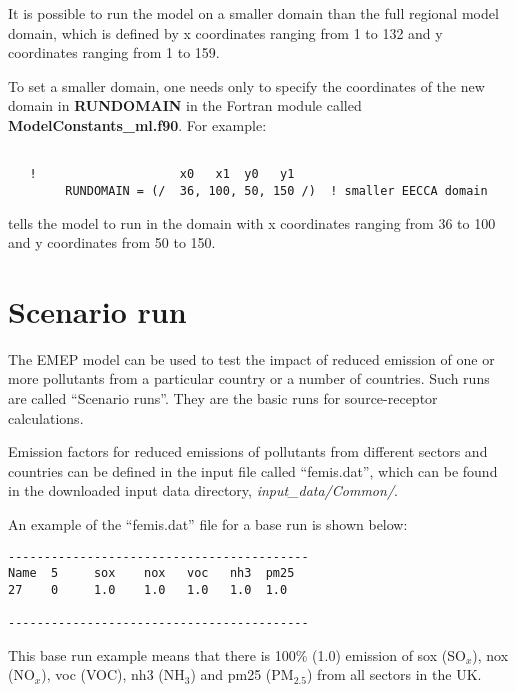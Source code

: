 It is possible to run the model on a smaller domain than the full
regional model domain, which is defined by  x coordinates ranging
from 1 to 132 and y coordinates ranging from 1 to 159. 

To set a smaller domain, one needs only to specify the
coordinates of the new domain in {\bf RUNDOMAIN} in the Fortran module
called {\bf ModelConstants\_ml.f90}. For example:


\begin{verbatim}
  
   !                    x0   x1  y0   y1
        RUNDOMAIN = (/  36, 100, 50, 150 /)  ! smaller EECCA domain

\end{verbatim}

tells the model to run in the domain with x coordinates ranging from
36 to 100 and y coordinates from 50 to 150.\\ 

\section{Scenario run}

The EMEP  model can be used to test the impact of reduced emission of
one or more pollutants from a particular country or a number of
countries.  Such runs are called ``Scenario runs''. They are the basic
runs for source-receptor calculations.


Emission factors for reduced emissions of pollutants from different
sectors and countries can be defined in the input file called
``femis.dat'', which can be found in the downloaded input data
directory, {\sl input\_data/Common/}.

An example of the ``femis.dat'' file for a base run is shown below:

\begin{verbatim}
------------------------------------------
Name  5     sox    nox   voc   nh3  pm25
27    0     1.0    1.0   1.0   1.0  1.0  

------------------------------------------
\end{verbatim}

\noindent
This base run example means that there is 100\% (1.0) emission of sox (SO$_x$),
nox (NO$_x$), voc (VOC), nh3 (NH$_3$) and pm25 (PM$_{2.5}$) from all
sectors in the UK. 

